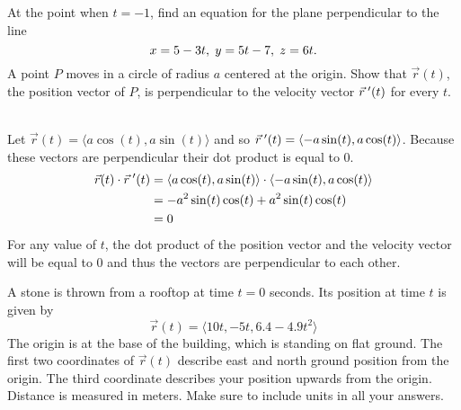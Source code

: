 \documentclass[12pt,letterpaper, onecolumn]{exam}
\begin{document}
\begin{questions}
\begin{solution}
\begin{parts}
		\part \makebox[0pt][l]{%
			\begin{minipage}{\textwidth}
				\centering
			 \texttt{[image: ps8q1]}
			\end{minipage}
		} 
			\end{parts}
		\end{solution}
		\question At the point when $t=-1$, find an equation for the plane perpendicular to the line
		$$x=5-3t,\hspace*{0.10cm}y=5t-7,\hspace*{0.10cm}z=6t.$$
		\question A point $P$ moves in a circle of radius $a$ centered at the origin. Show that $\vec{r}(t)$, the position vector of $P$, is perpendicular to the velocity vector $\vec{r}\hspace*{0.08cm}'(t)$ for every $t$.
		\begin{solution}\\
			Let $\vec{r}(t)=\langle a\cos(t),a\sin(t)\rangle$ and so $\vec{r}\hspace*{0.08cm}'(t)=\langle -a\sin(t),a\cos(t)\rangle$. Because these vectors are perpendicular their dot product is equal to 0. 
			\begin{align*}
				\vec{r}(t)\cdot\vec{r}\hspace*{0.08cm}'(t)&=\langle a\cos(t),a\sin(t)\rangle\cdot\langle -a\sin(t),a\cos(t)\rangle\\
				&=-a^2\sin(t)\cos(t)+a^2\sin(t)\cos(t)\\
				&=0
			\end{align*}
			For any value of $t$, the dot product of the position vector and the velocity vector will be equal to 0 and thus the vectors are perpendicular to each other. 
		\end{solution}
		\question A stone is thrown from a rooftop at time $t=0$ seconds. Its position at time $t$ is given by
		$$\vec{r}(t)=\langle10t,-5t,6.4-4.9t^2\rangle$$
		The origin is at the base of the building, which is standing on flat ground. The first two coordinates of $\vec{r}(t)$ describe east and north ground position from the origin. The third coordinate describes your position upwards from the origin. Distance is measured in meters. Make sure to include units in all your answers.
\end{questions}
\end{document}
